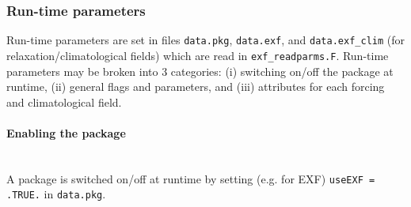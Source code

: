 
\subsubsection{Run-time parameters
\label{sec:pkg:exf:runtime}}

Run-time parameters are set in files 
\texttt{data.pkg}, \texttt{data.exf}, and 
\texttt{data.exf\_clim} (for relaxation/climatological fields)
which are read in \texttt{exf\_readparms.F}.
Run-time parameters may be broken into 3 categories:
(i) switching on/off the package at runtime,
(ii) general flags and parameters, and
(iii) attributes for each forcing and climatological field.

\paragraph{Enabling the package}
~ \\
%
A package is switched on/off at runtime by setting
(e.g. for EXF) \texttt{useEXF = .TRUE.} in \texttt{data.pkg}.

